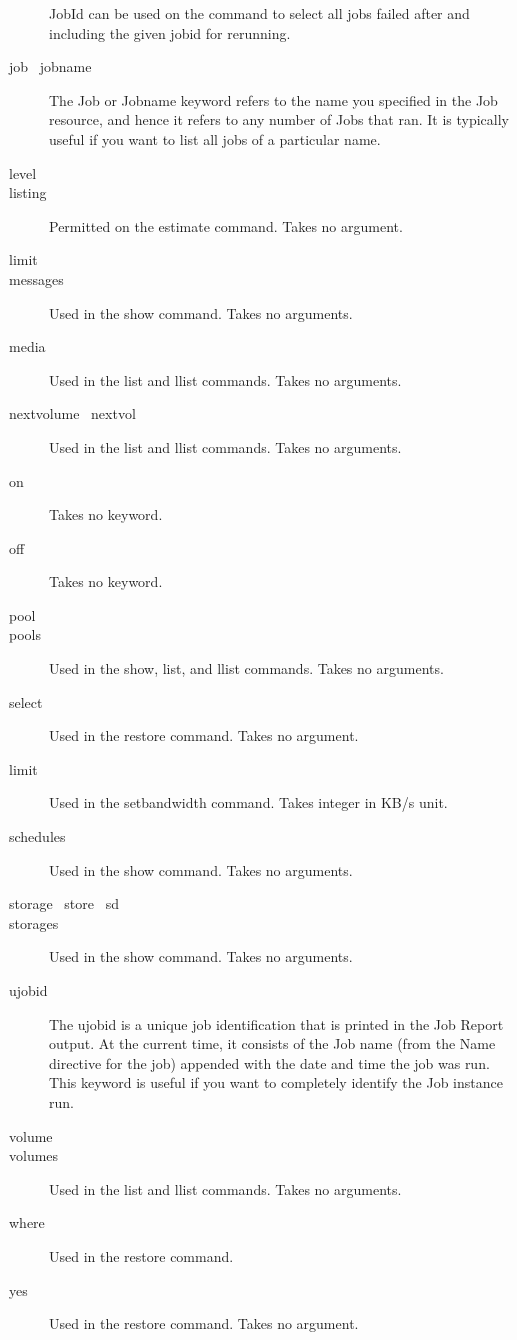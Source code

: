 \begin{description}
  JobId can be used on the  command to select all jobs failed after and including the given jobid for rerunning.
\item [job \textbar\  jobname]
  The Job or Jobname keyword refers to the name you specified
  in the Job resource, and hence it refers to any number of
  Jobs that ran.  It is typically useful if you want to list
  all jobs of a particular name.
\item [level]
\item [listing]
  Permitted on the estimate command. Takes no argument.
\item [limit]
\item [messages]
  Used in the show command. Takes no arguments.
\item [media]
  Used in the list and llist commands. Takes no arguments.
\item [nextvolume \textbar\ nextvol]
  Used in the list and llist commands. Takes no arguments.
\item [on]
  Takes no keyword.
\item [off]
  Takes no keyword.
\item [pool]
\item [pools]
  Used in the show, list, and llist commands. Takes no arguments.
\item [select]
  Used in the restore command. Takes no argument.
\item[limit]
  Used in the setbandwidth command. Takes integer in KB/s unit.
\item [schedules]
  Used in the show command. Takes no arguments.
\item [storage \textbar\ store \textbar\ sd]
\item [storages]
  Used in the show command. Takes no arguments.
\item [ujobid]
  The ujobid is a unique job identification that is printed
  in the Job Report output. At the current time, it consists
  of the Job name (from the Name directive for the job) appended
  with the date and time the job was run. This keyword is useful
  if you want to completely identify the Job instance run.
\item [volume]
\item [volumes]
  Used in the list and llist commands. Takes no arguments.
\item [where]
  Used in the restore command.
\item [yes]
  Used in the restore command. Takes no argument.
\end{description}


